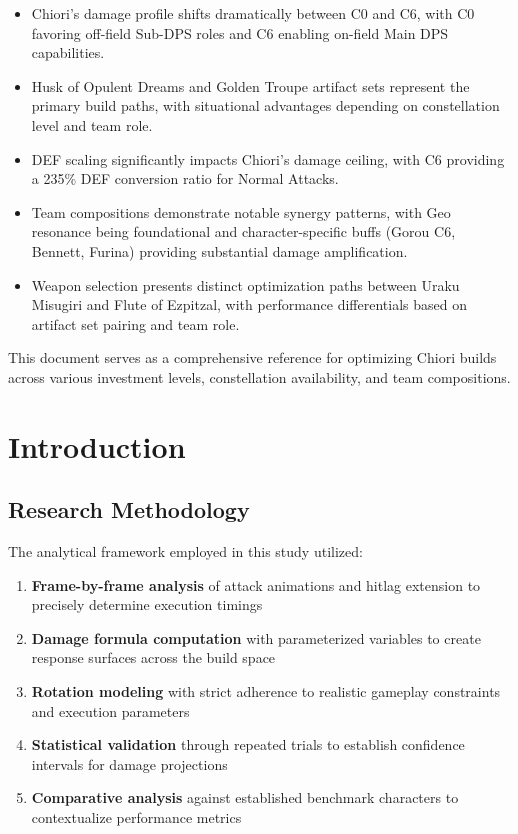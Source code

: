 \documentclass[12pt,a4paper]{article}
\begin{document}
\begin{itemize}
    \item Chiori's damage profile shifts dramatically between C0 and C6, with C0 favoring off-field Sub-DPS roles and C6 enabling on-field Main DPS capabilities.
    
    \item Husk of Opulent Dreams and Golden Troupe artifact sets represent the primary build paths, with situational advantages depending on constellation level and team role.
    
    \item DEF scaling significantly impacts Chiori's damage ceiling, with C6 providing a 235\% DEF conversion ratio for Normal Attacks.
    
    \item Team compositions demonstrate notable synergy patterns, with Geo resonance being foundational and character-specific buffs (Gorou C6, Bennett, Furina) providing substantial damage amplification.
    
    \item Weapon selection presents distinct optimization paths between Uraku Misugiri and Flute of Ezpitzal, with performance differentials based on artifact set pairing and team role.
\end{itemize}

This document serves as a comprehensive reference for optimizing Chiori builds across various investment levels, constellation availability, and team compositions.

\section{Introduction}

\subsection{Research Methodology}

The analytical framework employed in this study utilized:

\begin{enumerate}
    \item \textbf{Frame-by-frame analysis} of attack animations and hitlag extension to precisely determine execution timings
    \item \textbf{Damage formula computation} with parameterized variables to create response surfaces across the build space
    \item \textbf{Rotation modeling} with strict adherence to realistic gameplay constraints and execution parameters
    \item \textbf{Statistical validation} through repeated trials to establish confidence intervals for damage projections
    \item \textbf{Comparative analysis} against established benchmark characters to contextualize performance metrics
\end{enumerate}
\end{document}
